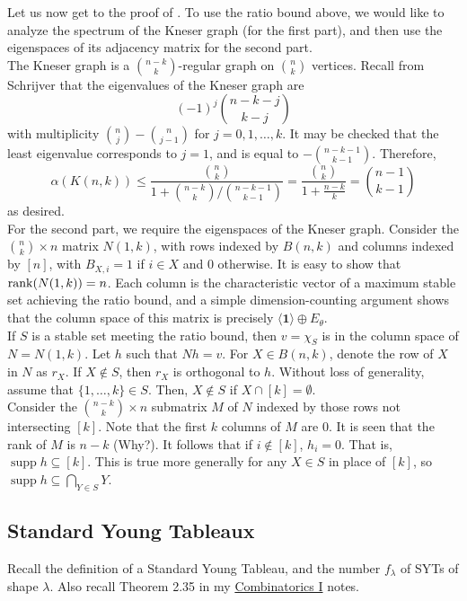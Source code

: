 Let us now get to the proof of . To use the ratio bound above, we would like to analyze the spectrum of the Kneser graph (for the first part), and then use the eigenspaces of its adjacency matrix for the second part.\\
The Kneser graph is a $\binom{n-k}{k}$-regular graph on $\binom{n}{k}$ vertices. Recall from Schrijver that the eigenvalues of the Kneser graph are
\[ (-1)^j \binom{n-k-j}{k-j} \]
with multiplicity $\binom{n}{j} - \binom{n}{j-1}$ for $j=0,1,\ldots,k$. It may be checked that the least eigenvalue corresponds to $j=1$, and is equal to $-\binom{n-k-1}{k-1}$. Therefore,
\[ \alpha(K(n,k)) \le \frac{\binom{n}{k}}{1 + \binom{n-k}{k}/\binom{n-k-1}{k-1}} = \frac{\binom{n}{k}}{1 + \frac{n-k}{k}} = \binom{n-1}{k-1} \]
as desired.\\

For the second part, we require the eigenspaces of the Kneser graph. Consider the $\binom{n}{k} \times n$ matrix $N(1,k)$, with rows indexed by $B(n,k)$ and columns indexed by $[n]$, with $B_{X,i} = 1$ if $i \in X$ and $0$ otherwise. It is easy to show that $\operatorname{rank}(N(1,k)) = n$. Each column is the characteristic vector of a maximum stable set achieving the ratio bound, and a simple dimension-counting argument shows that the column space of this matrix is precisely $\langle \mathbf{1}\rangle \oplus E_\theta$.\\
If $S$ is a stable set meeting the ratio bound, then $v = \chi_S$ is in the column space of $N = N(1,k)$. Let $h$ such that $Nh = v$. For $X \in B(n,k)$, denote the row of $X$ in $N$ as $r_X$. If $X \not\in S$, then $r_X$ is orthogonal to $h$. Without loss of generality, assume that $\{1,\ldots,k\} \in S$. Then, $X \not\in S$ if $X \cap [k] = \emptyset$.\\
Consider the $\binom{n-k}{k} \times n$ submatrix $M$ of $N$ indexed by those rows not intersecting $[k]$. Note that the first $k$ columns of $M$ are $0$. It is seen that the rank of $M$ is $n-k$ (Why?). It follows that if $i \not\in [k]$, $h_i = 0$. That is, $\operatorname{supp} h \subseteq [k]$. This is true more generally for any $X \in S$ in place of $[k]$, so $\operatorname{supp} h \subseteq \bigcap_{Y \in S} Y$.

\subsection{Standard Young Tableaux}

Recall the definition of a Standard Young Tableau, and the number $f_\lambda$ of SYTs of shape $\lambda$. Also recall Theorem 2.35 in my \href{https://amitrajaraman.github.io/notes/ma-861/}{Combinatorics I} notes.

